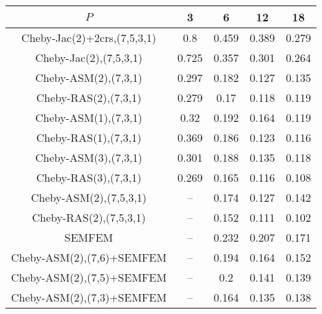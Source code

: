 \begin{table*}
\centering
\begin{tabular}{||c||cccc||}
	\hline
	$P$ & 3 & 6 & 12 & 18 \\
	\hline\hline
	Cheby-Jac(2)+2crs,(7,5,3,1)	&	0.8	&	0.459	&	0.389	&	0.279\\
	Cheby-Jac(2),(7,5,3,1)	&	0.725	&	0.357	&	0.301	&	0.264\\
	Cheby-ASM(2),(7,3,1)	&	0.297	&	0.182	&	0.127	&	0.135\\
	Cheby-RAS(2),(7,3,1)	&	0.279	&	0.17	&	0.118	&	0.119\\
	Cheby-ASM(1),(7,3,1)	&	0.32	&	0.192	&	0.164	&	0.119\\
	Cheby-RAS(1),(7,3,1)	&	0.369	&	0.186	&	0.123	&	0.116\\
	Cheby-ASM(3),(7,3,1)	&	0.301	&	0.188	&	0.135	&	0.118\\
	Cheby-RAS(3),(7,3,1)	&	0.269	&	0.165	&	0.116	&	0.108\\
	Cheby-ASM(2),(7,5,3,1)	&	 --	&	0.174	&	0.127	&	0.142\\
	Cheby-RAS(2),(7,5,3,1)	&	 --	&	0.152	&	0.111	&	0.102\\
	SEMFEM	&	 --	&	0.232	&	0.207	&	0.171\\
	Cheby-ASM(2),(7,6)+SEMFEM	&	 --	&	0.194	&	0.164	&	0.152\\
	Cheby-ASM(2),(7,5)+SEMFEM	&	 --	&	0.2	&	0.141	&	0.139\\
	Cheby-ASM(2),(7,3)+SEMFEM	&	 --	&	0.164	&	0.135	&	0.138\\
\hline
\end{tabular}
\caption{\label{table:foobar}}
\end{table*}
